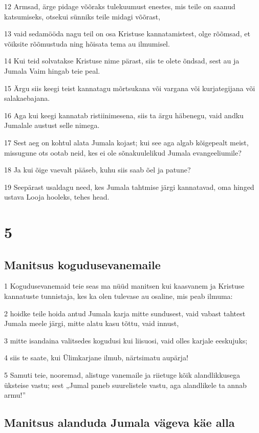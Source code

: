 \par 12 Armsad, ärge pidage võõraks tulekuumust enestes, mis teile on saanud katsumiseks, otsekui sünniks teile midagi võõrast,
\par 13 vaid sedamööda nagu teil on osa Kristuse kannatamistest, olge rõõmsad, et võiksite rõõmustuda ning hõisata tema au ilmumisel.
\par 14 Kui teid solvatakse Kristuse nime pärast, siis te olete õndsad, sest au ja Jumala Vaim hingab teie peal.
\par 15 Ärgu siis keegi teist kannatagu mõrtsukana või vargana või kurjategijana või salakaebajana.
\par 16 Aga kui keegi kannatab ristiinimesena, siis ta ärgu häbenegu, vaid andku Jumalale austust selle nimega.
\par 17 Sest aeg on kohtul alata Jumala kojast; kui see aga algab kõigepealt meist, missugune ots ootab neid, kes ei ole sõnakuulelikud Jumala evangeeliumile?
\par 18 Ja kui õige vaevalt pääseb, kuhu siis saab õel ja patune?
\par 19 Seepärast usaldagu need, kes Jumala tahtmise järgi kannatavad, oma hinged ustava Looja hooleks, tehes head.


\chapter{5}

\section*{Manitsus kogudusevanemaile}

\par 1 Kogudusevanemaid teie seas ma nüüd manitsen kui kaasvanem ja Kristuse kannatuste tunnistaja, kes ka olen tulevase au osaline, mis peab ilmuma:
\par 2 hoidke teile hoida antud Jumala karja mitte sundusest, vaid vabast tahtest Jumala meele järgi, mitte alatu kasu tõttu, vaid innust,
\par 3 mitte isandaina valitsedes kogudusi kui liisuosi, vaid olles karjale eeskujuks;
\par 4 siis te saate, kui Ülimkarjane ilmub, närtsimatu aupärja!
\par 5 Samuti teie, nooremad, alistuge vanemaile ja riietuge kõik alandlikkusega üksteise vastu; sest „Jumal paneb suurelistele vastu, aga alandlikele ta annab armu!”

\section*{Manitsus alanduda Jumala vägeva käe alla}

